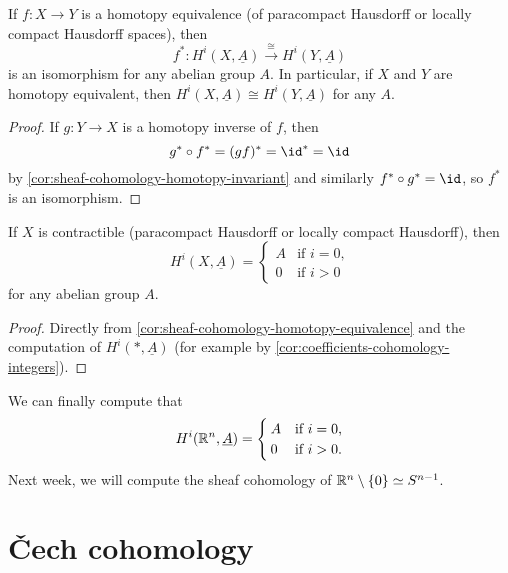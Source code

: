 \begin{cor}\label{cor:sheaf-cohomology-homotopy-equivalence}
If \(f\colon X\to Y\) is a homotopy equivalence (of paracompact Hausdorff or locally compact Hausdorff spaces), then
\[ f^*\colon H^i(X,\underline{A})\xrightarrow{\cong} H^i(Y,\underline{A}) \]
is an isomorphism for any abelian group \(A\).
In particular, if \(X\) and \(Y\) are homotopy equivalent, then \(H^i(X,\underline{A})\cong H^i(Y,\underline{A})\) for any \(A\).
\end{cor}
\begin{proof}
If \(g\colon Y\to X\) is a homotopy inverse of \(f\), then
\[ g^*\circ f^* = (gf)^* = \id^* = \id \]
by \cref{cor:sheaf-cohomology-homotopy-invariant} and similarly \(f^*\circ g^*=\id\), so \(f^*\) is an isomorphism.
\end{proof}

\begin{cor}
If \(X\) is contractible (paracompact Hausdorff or locally compact Hausdorff), then
\[ H^i(X,\underline{A}) =
  \begin{cases}
    A & \text{if } i = 0\text{,} \\
    0 & \text{if } i > 0
  \end{cases}
\]
for any abelian group \(A\).
\end{cor}
\begin{proof}
Directly from \cref{cor:sheaf-cohomology-homotopy-equivalence} and the computation of \(H^i(*,\underline{A})\) (for example by \cref{cor:coefficients-cohomology-integers}).
\end{proof}

\begin{exmp}
We can finally compute that
\[ H^i(\mathbb{R}^n,\underline{A}) =
  \begin{cases}
    A & \text{if } i = 0\text{,} \\
    0 & \text{if } i > 0\text{.}
  \end{cases}
\]
Next week, we will compute the sheaf cohomology of \(\bb R^n\setminus\{0\}\simeq\sphere[n-1]\).
\end{exmp}

\section{Čech cohomology}

